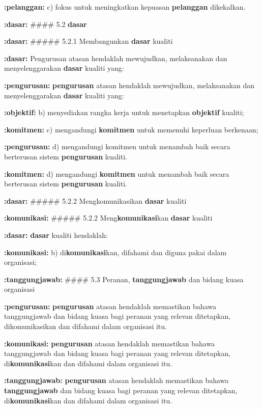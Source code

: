 \documentclass{article}
\begin{document}
\textbf{:pelanggan:} c) fokus untuk meningkatkan kepuasan \textbf{pelanggan} dikekalkan.

\textbf{:dasar:} \#\#\#\# 5.2 \textbf{dasar}

\textbf{:dasar:} \#\#\#\#\# 5.2.1 Membangunkan \textbf{dasar} kualiti

\textbf{:dasar:} Pengurusan atasan hendaklah mewujudkan, melaksanakan dan menyelenggarakan \textbf{dasar}
kualiti yang:

\textbf{:pengurusan:} \textbf{pengurusan} atasan hendaklah mewujudkan, melaksanakan dan menyelenggarakan \textbf{dasar}
kualiti yang:

\textbf{:objektif:} b) menyediakan rangka kerja untuk menetapkan \textbf{objektif} kualiti;

\textbf{:komitmen:} c) mengandungi \textbf{komitmen} untuk memenuhi keperluan berkenaan;

\textbf{:pengurusan:} d) mengandungi komitmen untuk menambah baik secara berterusan sistem \textbf{pengurusan}
kualiti.

\textbf{:komitmen:} d) mengandungi \textbf{komitmen} untuk menambah baik secara berterusan sistem \textbf{pengurusan}
kualiti.

\textbf{:dasar:} \#\#\#\#\# 5.2.2 Mengkomunikasikan \textbf{dasar} kualiti

\textbf{:komunikasi:} \#\#\#\#\# 5.2.2 Meng\textbf{komunikasi}kan \textbf{dasar} kualiti

\textbf{:dasar:} \textbf{dasar} kualiti hendaklah:

\textbf{:komunikasi:} b) di\textbf{komunikasi}kan, difahami dan diguna pakai dalam organisasi;

\textbf{:tanggungjawab:} \#\#\#\# 5.3 Peranan, \textbf{tanggungjawab} dan bidang kuasa organisasi

\textbf{:pengurusan:} \textbf{pengurusan} atasan hendaklah memastikan bahawa tanggungjawab dan bidang kuasa bagi
peranan yang relevan ditetapkan, dikomunikasikan dan difahami dalam organisasi itu.

\textbf{:komunikasi:} \textbf{pengurusan} atasan hendaklah memastikan bahawa tanggungjawab dan bidang kuasa bagi
peranan yang relevan ditetapkan, di\textbf{komunikasi}kan dan difahami dalam organisasi itu.

\textbf{:tanggungjawab:} \textbf{pengurusan} atasan hendaklah memastikan bahawa \textbf{tanggungjawab} dan bidang kuasa bagi
peranan yang relevan ditetapkan, di\textbf{komunikasi}kan dan difahami dalam organisasi itu.
\end{document}

